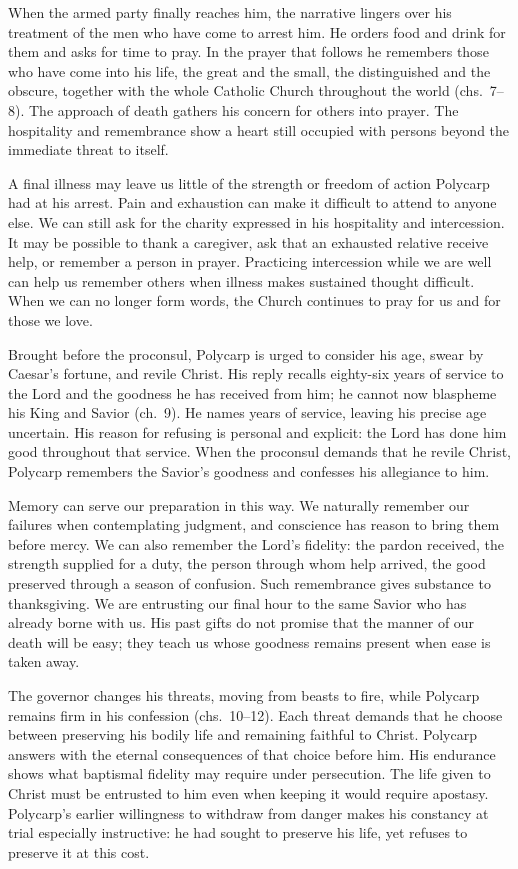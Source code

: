 When the armed party finally reaches him, the narrative lingers over his treatment of the men who have come to arrest him. He orders food and drink for them and asks for time to pray. In the prayer that follows he remembers those who have come into his life, the great and the small, the distinguished and the obscure, together with the whole Catholic Church throughout the world (chs.~7--8). The approach of death gathers his concern for others into prayer. The hospitality and remembrance show a heart still occupied with persons beyond the immediate threat to itself.

A final illness may leave us little of the strength or freedom of action Polycarp had at his arrest. Pain and exhaustion can make it difficult to attend to anyone else. We can still ask for the charity expressed in his hospitality and intercession. It may be possible to thank a caregiver, ask that an exhausted relative receive help, or remember a person in prayer. Practicing intercession while we are well can help us remember others when illness makes sustained thought difficult. When we can no longer form words, the Church continues to pray for us and for those we love.

Brought before the proconsul, Polycarp is urged to consider his age, swear by Caesar's fortune, and revile Christ. His reply recalls eighty-six years of service to the Lord and the goodness he has received from him; he cannot now blaspheme his King and Savior (ch.~9). He names years of service, leaving his precise age uncertain. His reason for refusing is personal and explicit: the Lord has done him good throughout that service. When the proconsul demands that he revile Christ, Polycarp remembers the Savior's goodness and confesses his allegiance to him.

Memory can serve our preparation in this way. We naturally remember our failures when contemplating judgment, and conscience has reason to bring them before mercy. We can also remember the Lord's fidelity: the pardon received, the strength supplied for a duty, the person through whom help arrived, the good preserved through a season of confusion. Such remembrance gives substance to thanksgiving. We are entrusting our final hour to the same Savior who has already borne with us. His past gifts do not promise that the manner of our death will be easy; they teach us whose goodness remains present when ease is taken away.

The governor changes his threats, moving from beasts to fire, while Polycarp remains firm in his confession (chs.~10--12). Each threat demands that he choose between preserving his bodily life and remaining faithful to Christ. Polycarp answers with the eternal consequences of that choice before him. His endurance shows what baptismal fidelity may require under persecution. The life given to Christ must be entrusted to him even when keeping it would require apostasy. Polycarp's earlier willingness to withdraw from danger makes his constancy at trial especially instructive: he had sought to preserve his life, yet refuses to preserve it at this cost.

